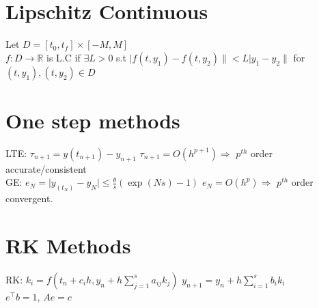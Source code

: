 \documentclass[10pt]{article}
\begin{document}
\noindent
\section*{Lipschitz Continuous}
Let $D=[t_0,t_f]\times [-M,M]$\\
 $f:D\rightarrow \mathbb{R}$ is L.C if $\exists L>0$ s.t $\lvert f(t,y_1)-f(t,y_2)\rVert <L\lvert y_1-y_2\rVert$ for $(t,y_1),(t,y_2)\in D$
\section*{One step methods}
LTE\@: $\tau_{n+1}=y(t_{n+1})-y_{n+1}$ 
$\tau_{n+1}=O(h^{p+1})\Rightarrow$ $p^{th}$ order accurate/consistent\\
GE\@: $e_N=\lvert y_(t_N)-y_N\rvert\le \frac{\theta}{s}(\exp(Ns)-1)$ 
$e_N=O(h^{p})\Rightarrow$ $p^{th}$ order convergent.
\section*{RK Methods}
RK\@: $k_i=f(t_n+c_i h,y_n+h\sum_{j=1}^{s}a_{ij}k_j)$ $y_{n+1}=y_n+h\sum_{i=1}^{s}b_i k_i$\\ 
$e^\top b=1$, $Ae=c$
\end{document}
